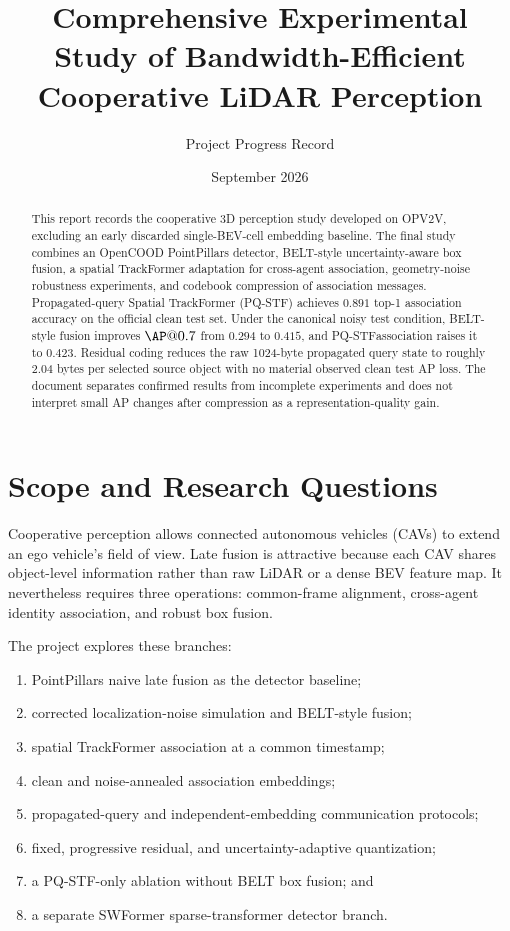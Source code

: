 \documentclass[11pt]{article}
\title{Comprehensive Experimental Study of Bandwidth-Efficient\\
Cooperative LiDAR Perception}
\author{Project Progress Record}
\date{September 2026}
\newcommand{\PQSTF}{\textsc{PQ-STF}}
\begin{document}
\maketitle

\begin{abstract}
This report records the cooperative 3D perception study developed on OPV2V,
excluding an early discarded single-BEV-cell embedding baseline. The final
study combines an OpenCOOD PointPillars detector, BELT-style
uncertainty-aware box fusion, a spatial TrackFormer adaptation for cross-agent
association, geometry-noise robustness experiments, and codebook compression
of association messages. Propagated-query Spatial TrackFormer (\PQSTF)
achieves $0.891$ top-1 association accuracy on the official clean test set.
Under the canonical noisy test condition, BELT-style fusion improves
$\AP@0.7$ from $0.294$ to $0.415$, and \PQSTF association raises it to
$0.423$. Residual coding reduces the raw 1024-byte propagated query state to
roughly 2.04 bytes per selected source object with no material observed clean
test AP loss. The document separates confirmed results from incomplete
experiments and does not interpret small AP changes after compression as a
representation-quality gain.
\end{abstract}

\tableofcontents
\newpage

\section{Scope and Research Questions}

Cooperative perception allows connected autonomous vehicles (CAVs) to extend
an ego vehicle's field of view. Late fusion is attractive because each CAV
shares object-level information rather than raw LiDAR or a dense BEV feature
map. It nevertheless requires three operations: common-frame alignment,
cross-agent identity association, and robust box fusion.

The project explores these branches:
\begin{enumerate}
  \item PointPillars naive late fusion as the detector baseline;
  \item corrected localization-noise simulation and BELT-style fusion;
  \item spatial TrackFormer association at a common timestamp;
  \item clean and noise-annealed association embeddings;
  \item propagated-query and independent-embedding communication protocols;
  \item fixed, progressive residual, and uncertainty-adaptive quantization;
  \item a PQ-STF-only ablation without BELT box fusion; and
  \item a separate SWFormer sparse-transformer detector branch.
\end{enumerate}
\end{document}
